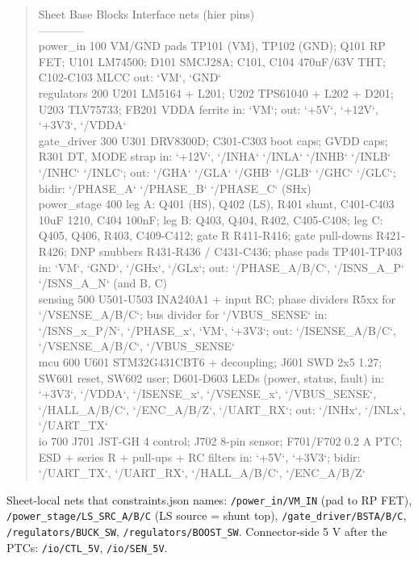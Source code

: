\documentclass[11pt,a4paper]{article}
\begin{document}
\begin{quote}\small\ttfamily\raggedright
\textbar{} Sheet \textbar{} Base \textbar{} Blocks \textbar{} Interface nets (hier pins) \textbar{}\\
\textbar{}---\textbar{}---\textbar{}---\textbar{}---\textbar{}\\
\textbar{} power\_in \textbar{} 100 \textbar{} VM/GND pads TP101 (VM), TP102 (GND); Q101 RP FET; U101 LM74500; D101 SMCJ28A; C101, C104 470uF/63V THT; C102-C103 MLCC \textbar{} out: `VM`, `GND` \textbar{}\\
\textbar{} regulators \textbar{} 200 \textbar{} U201 LM5164 + L201; U202 TPS61040 + L202 + D201; U203 TLV75733; FB201 VDDA ferrite \textbar{} in: `VM`; out: `+5V`, `+12V`, `+3V3`, `/VDDA` \textbar{}\\
\textbar{} gate\_driver \textbar{} 300 \textbar{} U301 DRV8300D; C301-C303 boot caps; GVDD caps; R301 DT, MODE strap \textbar{} in: `+12V`, `/INHA` `/INLA` `/INHB` `/INLB` `/INHC` `/INLC`; out: `/GHA` `/GLA` `/GHB` `/GLB` `/GHC` `/GLC`; bidir: `/PHASE\_A` `/PHASE\_B` `/PHASE\_C` (SHx) \textbar{}\\
\textbar{} power\_stage \textbar{} 400 \textbar{} leg A: Q401 (HS), Q402 (LS), R401 shunt, C401-C403 10uF 1210, C404 100nF; leg B: Q403, Q404, R402, C405-C408; leg C: Q405, Q406, R403, C409-C412; gate R R411-R416; gate pull-downs R421-R426; DNP snubbers R431-R436 / C431-C436; phase pads TP401-TP403 \textbar{} in: `VM`, `GND`, `/GHx`, `/GLx`; out: `/PHASE\_A/B/C`, `/ISNS\_A\_P` `/ISNS\_A\_N` (and B, C) \textbar{}\\
\textbar{} sensing \textbar{} 500 \textbar{} U501-U503 INA240A1 + input RC; phase dividers R5xx for `/VSENSE\_A/B/C`; bus divider for `/VBUS\_SENSE` \textbar{} in: `/ISNS\_x\_P/N`, `/PHASE\_x`, `VM`, `+3V3`; out: `/ISENSE\_A/B/C`, `/VSENSE\_A/B/C`, `/VBUS\_SENSE` \textbar{}\\
\textbar{} mcu \textbar{} 600 \textbar{} U601 STM32G431CBT6 + decoupling; J601 SWD 2x5 1.27; SW601 reset, SW602 user; D601-D603 LEDs (power, status, fault) \textbar{} in: `+3V3`, `/VDDA`, `/ISENSE\_x`, `/VSENSE\_x`, `/VBUS\_SENSE`, `/HALL\_A/B/C`, `/ENC\_A/B/Z`, `/UART\_RX`; out: `/INHx`, `/INLx`, `/UART\_TX` \textbar{}\\
\textbar{} io \textbar{} 700 \textbar{} J701 JST-GH 4 control; J702 8-pin sensor; F701/F702 0.2 A PTC; ESD + series R + pull-ups + RC filters \textbar{} in: `+5V`, `+3V3`; bidir: `/UART\_TX`, `/UART\_RX`, `/HALL\_A/B/C`, `/ENC\_A/B/Z` \textbar{}
\end{quote}
Sheet-local nets that constraints.json names: \texttt{/power\_in/VM\_IN} (pad to RP FET), \texttt{/power\_stage/LS\_SRC\_A/B/C} (LS source = shunt top), \texttt{/gate\_driver/BSTA/B/C}, \texttt{/regulators/BUCK\_SW}, \texttt{/regulators/BOOST\_SW}. Connector-side 5 V after the PTCs: \texttt{/io/CTL\_5V}, \texttt{/io/SEN\_5V}.
\end{document}
